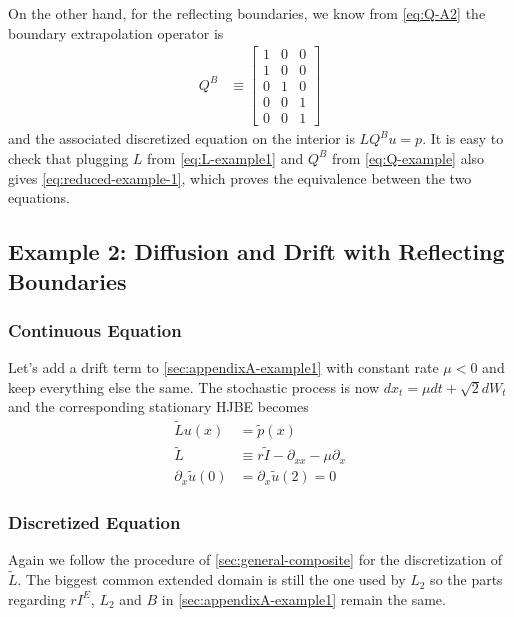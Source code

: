 \documentclass[11pt]{article}
\newcommand{\D}[1][]{\ensuremath{\partial_{#1}}}
\begin{document}
On the other hand, for the reflecting boundaries, we know from \cref{eq:Q-A2} the boundary extrapolation operator is
\begin{align}
	Q^B &\equiv \begin{bmatrix}
		1 & 0 & 0\\
		1 & 0 & 0\\
		0 & 1& 0\\
		0 & 0& 1\\
		0 & 0& 1
	\end{bmatrix}\label{eq:Q-example}
\end{align}
and the associated discretized equation on the interior is $LQ^Bu = p$. It is easy to check that plugging $L$ from \cref{eq:L-example1} and $Q^B$ from \cref{eq:Q-example} also gives \cref{eq:reduced-example-1}, which proves the equivalence between the two equations.

\subsection{Example 2: Diffusion and Drift with Reflecting Boundaries}\label{sec:appendixA-example2}
\subsubsection{Continuous Equation}
Let's add a drift term to \ref{sec:appendixA-example1} with constant rate $\mu < 0$ and keep everything else the same. The stochastic process is now $d x_t = \mu d t + \sqrt{2} d W_t$ and the corresponding stationary HJBE becomes
\begin{align}
	\tilde{L} u(x) &= \tilde{p}(x)\\
	\tilde{L} &\equiv r\tilde{I} - \D[xx] - \mu \D[x]\\
	\D[x]\tilde{u}(0) &= \D[x]\tilde{u}(2) = 0
\end{align}

\subsubsection{Discretized Equation}
Again we follow the procedure of \ref{sec:general-composite} for the discretization of $\tilde{L}$. The biggest common extended domain is still the one used by $L_2$ so the parts regarding $rI^E$, $L_2$ and $B$ in \ref{sec:appendixA-example1} remain the same.
\end{document}
